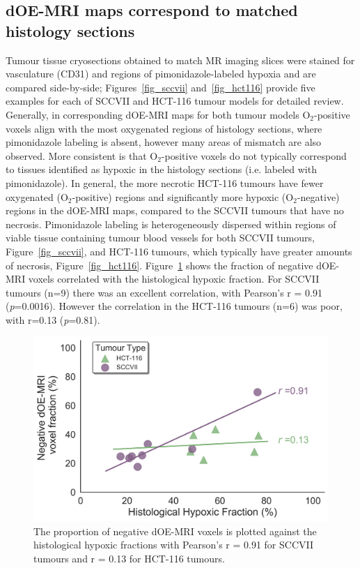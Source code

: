 
\subsection{\ac{dOE-MRI} maps correspond to matched histology sections}
\label{sec:histoSections}
Tumour tissue cryosections obtained to match MR imaging slices were stained for vasculature (\ac{CD31}) and regions of pimonidazole-labeled hypoxia and are compared side-by-side; Figures~\ref{fig_sccvii} and~\ref{fig_hct116} provide five examples for each of SCCVII and HCT-116 tumour models for detailed review.
Generally, in corresponding \ac{dOE-MRI} maps for both tumour models O$_2$-positive voxels align with the most oxygenated regions of histology sections, where pimonidazole labeling is absent, however many areas of mismatch are also observed. 
More consistent is that O$_2$-positive voxels do not typically correspond to tissues identified as hypoxic in the histology sections (i.e. labeled with pimonidazole).
In general, the more necrotic HCT-116 tumours have fewer oxygenated (O$_2$-positive) regions and significantly more hypoxic (O$_2$-negative) regions in the \ac{dOE-MRI} maps, compared to the SCCVII tumours that have no necrosis. 
Pimonidazole labeling is heterogeneously dispersed within regions of viable tissue containing tumour blood vessels for both SCCVII tumours, Figure~\ref{fig_sccvii}, and HCT-116 tumours, which typically have greater amounts of necrosis, Figure~\ref{fig_hct116}.
Figure~\ref{histo_correlations} shows the fraction of negative \ac{dOE-MRI} voxels correlated with the histological hypoxic fraction. 
For SCCVII tumours (n=9) there was an excellent correlation, with Pearson's r = 0.91 (\textit{p}=0.0016). 
However the correlation in the HCT-116 tumours (n=6) was poor, with r=0.13 (\textit{p}=0.81). 

\begin{figure}[htbp]
   \includegraphics[width=\textwidth]{oemri_thesis1/oemri_thesis1-images/histocorrel2.png} %
   \caption{The proportion of negative \ac{dOE-MRI} voxels is plotted against the histological hypoxic fractions with Pearson's r = 0.91 for SCCVII tumours and r = 0.13 for HCT-116 tumours.
   \label{histo_correlations}}
\end{figure}

